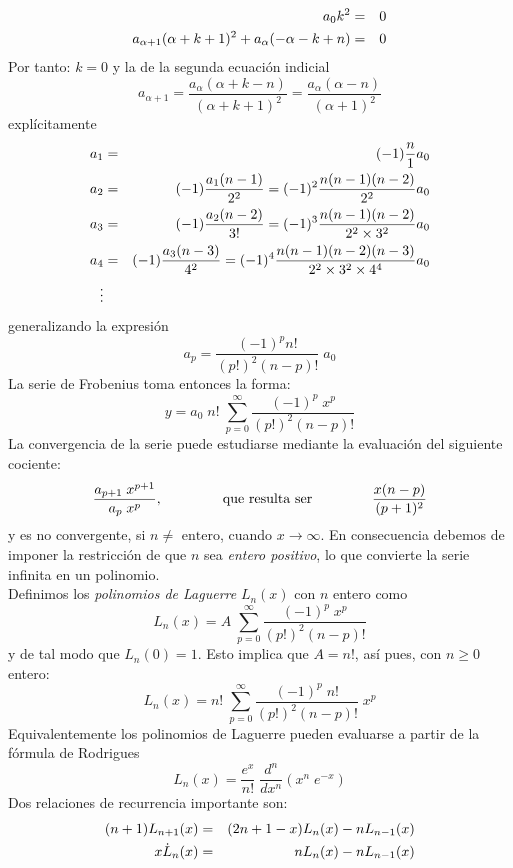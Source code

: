 \begin{eqnarray}
a_{0} k^{2} &=& 0 \nonumber \\
a_{\alpha + 1} (\alpha + k + 1)^{2} + a_{\alpha} (-\alpha - k + n) &=& 0 \nonumber
\end{eqnarray}
Por tanto: $k = 0$ y la de la segunda ecuación indicial
\[ a_{\alpha + 1} = \dfrac{a_{\alpha} (\alpha + k - n)}{(\alpha + k + 1)^{2}} = \dfrac{a_{\alpha} (\alpha - n)}{(\alpha + 1)^{2}} \]
explícitamente
\begin{eqnarray*}
a_{1} &=& (-1) \dfrac{n}{1} a_{0} \nonumber \\
a_{2} &=& (-1) \dfrac{a_{1} (n - 1)}{2^{2}} = (-1)^{2} \dfrac{n (n - 1)(n - 2)}{2^{2}} a_{0} \nonumber \\
a_{3} &=& (-1) \dfrac{a_{2} (n - 2)}{3!} = (-1)^{3} \dfrac{n (n - 1)(n - 2)}{2^{2} \times 3^{2}} a_{0} \nonumber \\
a_{4} &=& (-1) \dfrac{a_{3} (n - 3)}{4^{2}} = (-1)^{4} \dfrac{n (n - 1)(n - 2)(n - 3)}{2^{2} \times 3^{2} \times 4^{4}} a_{0} \nonumber \\
\vdots
\end{eqnarray*}
generalizando la expresión
\[ a_{p} = \dfrac{(-1)^{p} n!}{(p!)^{2} (n - p)!} \; a_{0} \]
La serie de Frobenius toma entonces la forma:
\[ y = a_{0} \; n! \; \sum_{p=0}^{\infty} \dfrac{(-1)^{p} \; x^{p}}{(p!)^{2} (n - p)! } \]
La convergencia de la serie puede estudiarse mediante la evaluación del siguiente cociente:
\[ \dfrac{a_{p + 1} \; x^{p + 1}}{a_{p} \; x^{p}}, \hspace{1.5cm} \mbox{que resulta ser} \hspace{1.5cm} \dfrac{x(n - p)}{(p + 1)^{2}} \]
y es no convergente, si $n \neq \mbox{ entero}$, cuando $x \to \infty$. En consecuencia debemos de imponer la restricción de que $n$ sea \emph{entero positivo}, lo que convierte la serie infinita en un polinomio.
\\
Definimos los \emph{polinomios de Laguerre} $L_{n}(x)$ con $n$ entero como
\[ L_{n}(x) = A \; \sum_{p = 0}^{\infty} \dfrac{(-1)^{p} \; x^{p}}{(p!)^{2} (n - p)!} \]
y de tal modo que $L_{n}(0) = 1$. Esto implica que $A = n!$, así pues, con $n \geq 0$ entero:
\begin{equation}
\boxed{
L_{n}(x) = n! \; \sum_{p = 0}^{\infty} \dfrac{(-1)^{p} \; n!}{(p!)^{2} (n - p)!} \; x^{p}
}
\label{eq:ecuacion_08_76}
\end{equation}
Equivalentemente los polinomios de Laguerre pueden evaluarse a partir de la fórmula de Rodrigues
\[ \boxed{ L_{n}(x) = \dfrac{e^{x}}{n!} \; \dfrac{d^{n}}{d x^{n}} (x^{n} \; e^{-x}) } \]
Dos relaciones de recurrencia importante son:
\begin{eqnarray*}
(n + 1) L_{n + 1}(x) &=& (2n + 1 - x) L_{n}(x) - n L_{n-1}(x) \nonumber \\
x \dot{L}_{n}(x) &=& n L_{n}(x) - n L_{n - 1}(x)
\end{eqnarray*}
